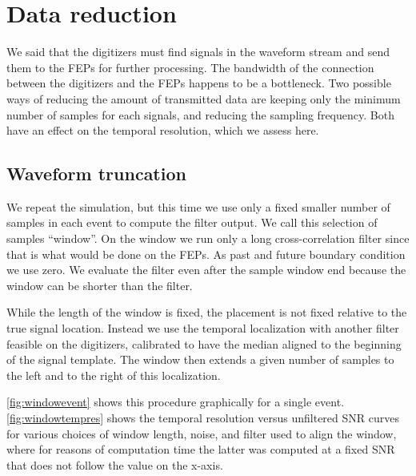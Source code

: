 \section{Data reduction}

We said that the digitizers must find signals in the waveform stream and send
them to the FEPs for further processing. The bandwidth of the connection
between the digitizers and the FEPs happens to be a bottleneck. Two possible
ways of reducing the amount of transmitted data are keeping only the minimum
number of samples for each signals, and reducing the sampling frequency. Both
have an effect on the temporal resolution, which we assess here.

\subsection{Waveform truncation}

We repeat the simulation, but this time we use only a fixed smaller number of
samples in each event to compute the filter output. We call this selection of
samples ``window''. On the window we run only a long cross-correlation filter
since that is what would be done on the FEPs. As past and future boundary
condition we use zero. We evaluate the filter even after the sample window end
because the window can be shorter than the filter.

While the length of the window is fixed, the placement is not fixed relative to
the true signal location. Instead we use the temporal localization with another
filter feasible on the digitizers, calibrated to have the median aligned to the
beginning of the signal template. The window then extends a given number of
samples to the left and to the right of this localization.

\autoref{fig:windowevent} shows this procedure graphically for a single
event. \autoref{fig:windowtempres} shows the temporal resolution versus
unfiltered SNR curves for various choices of window length, noise, and filter
used to align the window, where for reasons of computation time the latter was
computed at a fixed SNR that does not follow the value on the x-axis.

\begin{figure}
    
    

\end{figure}

